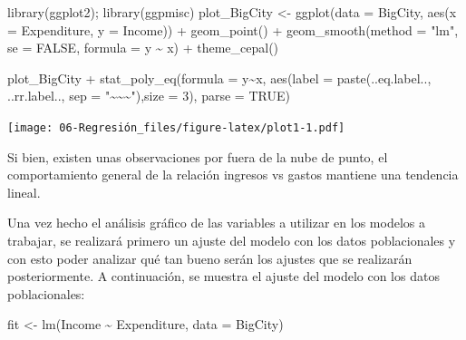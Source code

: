 \documentclass[
  12pt,
]{book}
\newenvironment{Shaded}{\begin{snugshade}}{\end{snugshade}}
\newcommand{\AttributeTok}[1]{\textcolor[rgb]{0.77,0.63,0.00}{#1}}
\newcommand{\ConstantTok}[1]{\textcolor[rgb]{0.00,0.00,0.00}{#1}}
\newcommand{\DecValTok}[1]{\textcolor[rgb]{0.00,0.00,0.81}{#1}}
\newcommand{\FunctionTok}[1]{\textcolor[rgb]{0.00,0.00,0.00}{#1}}
\newcommand{\NormalTok}[1]{#1}
\newcommand{\OtherTok}[1]{\textcolor[rgb]{0.56,0.35,0.01}{#1}}
\newcommand{\SpecialCharTok}[1]{\textcolor[rgb]{0.00,0.00,0.00}{#1}}
\newcommand{\StringTok}[1]{\textcolor[rgb]{0.31,0.60,0.02}{#1}}
\begin{document}
\begin{Shaded}
\begin{Highlighting}[]
\FunctionTok{library}\NormalTok{(ggplot2); }\FunctionTok{library}\NormalTok{(ggpmisc)}
\NormalTok{plot\_BigCity }\OtherTok{\textless{}{-}} \FunctionTok{ggplot}\NormalTok{(}\AttributeTok{data =}\NormalTok{ BigCity,}
                       \FunctionTok{aes}\NormalTok{(}\AttributeTok{x =}\NormalTok{ Expenditure, }\AttributeTok{y =}\NormalTok{ Income)) }\SpecialCharTok{+}
                       \FunctionTok{geom\_point}\NormalTok{() }\SpecialCharTok{+} \FunctionTok{geom\_smooth}\NormalTok{(}\AttributeTok{method =} \StringTok{"lm"}\NormalTok{,}
                       \AttributeTok{se =} \ConstantTok{FALSE}\NormalTok{,}
                       \AttributeTok{formula =}\NormalTok{ y }\SpecialCharTok{\textasciitilde{}}\NormalTok{ x) }\SpecialCharTok{+} \FunctionTok{theme\_cepal}\NormalTok{()}

\NormalTok{plot\_BigCity }\SpecialCharTok{+} \FunctionTok{stat\_poly\_eq}\NormalTok{(}\AttributeTok{formula =}\NormalTok{ y}\SpecialCharTok{\textasciitilde{}}\NormalTok{x, }\FunctionTok{aes}\NormalTok{(}\AttributeTok{label =} \FunctionTok{paste}\NormalTok{(..eq.label..,}
\NormalTok{   ..rr.label.., }\AttributeTok{sep =} \StringTok{"\textasciitilde{}\textasciitilde{}\textasciitilde{}"}\NormalTok{),}\AttributeTok{size =} \DecValTok{3}\NormalTok{), }\AttributeTok{parse =} \ConstantTok{TRUE}\NormalTok{)}
\end{Highlighting}
\end{Shaded}

\texttt{[image: 06-Regresión\_files/figure-latex/plot1-1.pdf]}

Si bien, existen unas observaciones por fuera de la nube de punto, el comportamiento general de la relación ingresos vs gastos mantiene una tendencia lineal.

Una vez hecho el análisis gráfico de las variables a utilizar en los modelos a trabajar, se realizará primero un ajuste del modelo con los datos poblacionales y con esto poder analizar qué tan bueno serán los ajustes que se realizarán posteriormente. A continuación, se muestra el ajuste del modelo con los datos poblacionales:

\begin{Shaded}
\begin{Highlighting}[]
\NormalTok{fit }\OtherTok{\textless{}{-}} \FunctionTok{lm}\NormalTok{(Income }\SpecialCharTok{\textasciitilde{}}\NormalTok{ Expenditure, }\AttributeTok{data =}\NormalTok{ BigCity)}
\end{Highlighting}
\end{Shaded}
\end{document}
